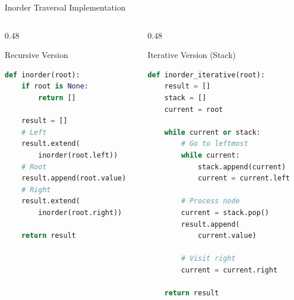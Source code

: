 \documentclass[aspectratio=169,xcolor=dvipsnames]{beamer}
\begin{document}
\begin{frame}[fragile]{Inorder Traversal Implementation}
  \begin{columns}
    \begin{column}{0.48\textwidth}
      \begin{block}{Recursive Version}
        \begin{lstlisting}[language=Python,basicstyle=\tiny\ttfamily]
def inorder(root):
    if root is None:
        return []

    result = []
    # Left
    result.extend(
        inorder(root.left))
    # Root
    result.append(root.value)
    # Right
    result.extend(
        inorder(root.right))

    return result
        \end{lstlisting}
      \end{block}
    \end{column}
    \begin{column}{0.48\textwidth}
      \begin{block}{Iterative Version (Stack)}
        \begin{lstlisting}[language=Python,basicstyle=\tiny\ttfamily]
def inorder_iterative(root):
    result = []
    stack = []
    current = root

    while current or stack:
        # Go to leftmost
        while current:
            stack.append(current)
            current = current.left

        # Process node
        current = stack.pop()
        result.append(
            current.value)

        # Visit right
        current = current.right

    return result
        \end{lstlisting}
      \end{block}
    \end{column}
  \end{columns}
\end{frame}
\end{document}
